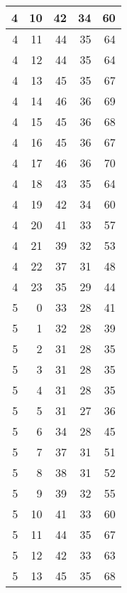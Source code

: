 \begin{longtable}{|r|r|r|r|r|}
    \hline
    4     & 10    & 42    & 34    & 60 \\
    \hline
    4     & 11    & 44    & 35    & 64 \\
    \hline
    4     & 12    & 44    & 35    & 64 \\
    \hline
    4     & 13    & 45    & 35    & 67 \\
    \hline
    4     & 14    & 46    & 36    & 69 \\
    \hline
    4     & 15    & 45    & 36    & 68 \\
    \hline
    4     & 16    & 45    & 36    & 67 \\
    \hline
    4     & 17    & 46    & 36    & 70 \\
    \hline
    4     & 18    & 43    & 35    & 64 \\
    \hline
    4     & 19    & 42    & 34    & 60 \\
    \hline
    4     & 20    & 41    & 33    & 57 \\
    \hline
    4     & 21    & 39    & 32    & 53 \\
    \hline
    4     & 22    & 37    & 31    & 48 \\
    \hline
    4     & 23    & 35    & 29    & 44 \\
    \hline
    5     & 0     & 33    & 28    & 41 \\
    \hline
    5     & 1     & 32    & 28    & 39 \\
    \hline
    5     & 2     & 31    & 28    & 35 \\
    \hline
    5     & 3     & 31    & 28    & 35 \\
    \hline
    5     & 4     & 31    & 28    & 35 \\
    \hline
    5     & 5     & 31    & 27    & 36 \\
    \hline
    5     & 6     & 34    & 28    & 45 \\
    \hline
    5     & 7     & 37    & 31    & 51 \\
    \hline
    5     & 8     & 38    & 31    & 52 \\
    \hline
    5     & 9     & 39    & 32    & 55 \\
    \hline
    5     & 10    & 41    & 33    & 60 \\
    \hline
    5     & 11    & 44    & 35    & 67 \\
    \hline
    5     & 12    & 42    & 33    & 63 \\
    \hline
    5     & 13    & 45    & 35    & 68 \\

\end{longtable}
